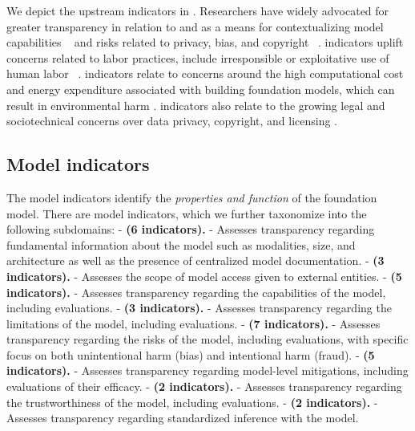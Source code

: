 \noindent We depict the upstream indicators in .
Researchers have widely advocated for greater transparency in relation to \data and \dataaccess \citep{bender-friedman-2018-data, gebru2018datasheets, hutchinson2021towards, dodge2021c4, bandy2021addressing} as a means for contextualizing model capabilities ~\citep{sambasivan2021everyone, longpre2023pretrainer} and risks related to privacy, bias, and copyright ~\citep{buolamwini2018gender,bender2021dangers, kandpal2022deduplicating,sobel2017artificial}.
\labor indicators uplift concerns related to labor practices, include irresponsible or exploitative use of human labor ~\citep{gray2019ghost, crawford2021atlas, hao2023cleaning, kittur2013future, dzieza2023ai, west2019data}.
\compute indicators relate to concerns around the high computational cost and energy expenditure associated with building foundation models, which can result in environmental harm \citep{lacoste2019quantifying,strubell2019energy,schwartz2020green,patterson2021carbon,bender2021dangers,henderson2020towards,luccioni2023counting,vipra2023comments}.
\datamitigations indicators also relate to the growing legal and sociotechnical concerns over data privacy, copyright, and licensing \citep{henderson2023foundation, brown2022does, lee2023talkin,genlaw2023,tremblay2023openai}.

\hypertarget{model-indicators}{\subsection{Model indicators}}
\label{sec:model-indicators}
The model indicators identify the \emph{properties and function} of the foundation model. 
There are \nummodelindicators model indicators, which we further taxonomize into the following \nummodelsubdomains subdomains:
-  \textbf{\modelbasics (6 indicators).}
- Assesses transparency regarding fundamental information about the model such as modalities, size, and architecture as well as the presence of centralized model documentation.
-  \textbf{\modelaccess (3 indicators).}
- Assesses the scope of model access given to external entities.
-  \textbf{\capabilities (5 indicators).}
- Assesses transparency regarding the capabilities of the model, including evaluations.
-  \textbf{\limitations (3 indicators).}
- Assesses transparency regarding the limitations of the model, including evaluations.
-  \textbf{\risks (7 indicators).}
- Assesses transparency regarding the risks of the model, including evaluations, with specific focus on both unintentional harm (\eg bias) and intentional harm (\eg fraud).
-  \textbf{\modelmitigations (5 indicators).}
- Assesses transparency regarding model-level mitigations, including evaluations of their efficacy.
-  \textbf{\trustworthiness (2 indicators).}
- Assesses transparency regarding the trustworthiness of the model, including evaluations.
-  \textbf{\inference (2 indicators).}
- Assesses transparency regarding standardized inference with the model.

